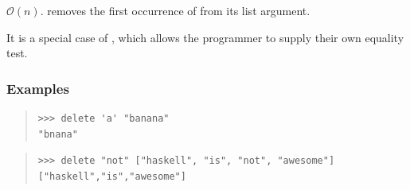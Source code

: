 \begin{haddockdesc}
\item[\begin{tabular}{@{}l}
delete :: Eq a => a -> {\char 91}a{\char 93} -> {\char 91}a{\char 93}
\end{tabular}]
{\haddockbegindoc
\(\mathcal{O}(n)\).   removes the first occurrence of  from
 its list argument.\par
It is a special case of , which allows the programmer to
 supply their own equality test.\par
\subsubsection*{\textbf{Examples}}
\begin{quote}
{\haddockverb\begin{verbatim}
>>> delete 'a' "banana"
"bnana"

\end{verbatim}}
\end{quote}
\begin{quote}
{\haddockverb\begin{verbatim}
>>> delete "not" ["haskell", "is", "not", "awesome"]
["haskell","is","awesome"]

\end{verbatim}}
\end{quote}}
\end{haddockdesc}
